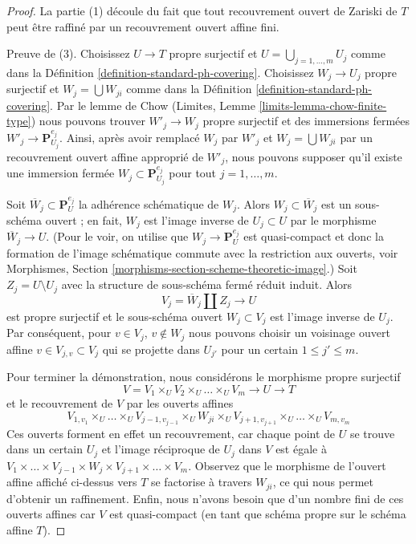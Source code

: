 \begin{proof}
La partie (1) découle du fait que tout recouvrement ouvert de Zariski de $T$ peut être raffiné par un recouvrement ouvert affine fini.

\medskip\noindent
Preuve de (3). Choisissez $U \to T$ propre surjectif et $U = \bigcup_{j = 1, \ldots, m} U_j$ comme dans la Définition \ref{definition-standard-ph-covering}. Choisissez $W_j \to U_j$ propre surjectif et $W_j = \bigcup W_{ji}$ comme dans la Définition \ref{definition-standard-ph-covering}. Par le lemme de Chow (Limites, Lemme \ref{limits-lemma-chow-finite-type}) nous pouvons trouver $W'_j \to W_j$ propre surjectif et des immersions fermées $W'_j \to \mathbf{P}^{e_j}_{U_j}$. Ainsi, après avoir remplacé $W_j$ par $W'_j$ et $W_j = \bigcup W_{ji}$ par un recouvrement ouvert affine approprié de $W'_j$, nous pouvons supposer qu'il existe une immersion fermée $W_j \subset \mathbf{P}^{e_j}_{U_j}$ pour tout $j = 1, \ldots, m$.

\medskip\noindent
Soit $\overline{W}_j \subset \mathbf{P}^{e_j}_U$ la adhérence schématique de $W_j$. Alors $W_j \subset \overline{W}_j$ est un sous-schéma ouvert ; en fait, $W_j$ est l'image inverse de $U_j \subset U$ par le morphisme $\overline{W}_j \to U$. (Pour le voir, on utilise que $W_j \to \mathbf{P}^{e_j}_U$ est quasi-compact et donc la formation de l'image schématique commute avec la restriction aux ouverts, voir Morphismes, Section \ref{morphisms-section-scheme-theoretic-image}.) Soit $Z_j = U \setminus U_j$ avec la structure de sous-schéma fermé réduit induit. Alors
$$
V_j = \overline{W}_j \amalg Z_j \to U
$$
est propre surjectif et le sous-schéma ouvert $W_j \subset V_j$ est l'image inverse de $U_j$. Par conséquent, pour $v \in V_j$, $v \not \in W_j$ nous pouvons choisir un voisinage ouvert affine $v \in V_{j, v} \subset V_j$ qui se projette dans $U_{j'}$ pour un certain $1 \leq j' \leq m$.

\medskip\noindent
Pour terminer la démonstration, nous considérons le morphisme propre surjectif
$$
V = V_1 \times_U V_2 \times_U \ldots \times_U V_m
\longrightarrow U \longrightarrow T
$$
et le recouvrement de $V$ par les ouverts affines
$$
V_{1, v_1} \times_U \ldots \times_U V_{j - 1, v_{j - 1}}
\times_U W_{j i} \times_U
V_{j + 1, v_{j + 1}} \times_U \ldots \times_U V_{m, v_m}
$$
Ces ouverts forment en effet un recouvrement, car chaque point de $U$ se trouve dans un certain $U_j$ et l'image réciproque de $U_j$ dans $V$ est égale à $V_1 \times \ldots \times V_{j - 1} \times W_j \times V_{j + 1} \times \ldots \times V_m$. Observez que le morphisme de l'ouvert affine affiché ci-dessus vers $T$ se factorise à travers $W_{ji}$, ce qui nous permet d'obtenir un raffinement. Enfin, nous n'avons besoin que d'un nombre fini de ces ouverts affines car $V$ est quasi-compact (en tant que schéma propre sur le schéma affine $T$).
\end{proof}

